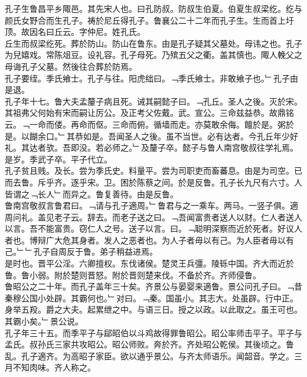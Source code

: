 \documentclass{zhvt-classic}
\begin{document}

\hspace*{2em}孔子生鲁昌平乡陬邑。其先宋人也。曰孔防叔。防叔生伯夏。伯夏生叔梁纥。纥与颜氏女野合而生孔子。祷於尼丘得孔子。鲁襄公二十二年而孔子生。生而首上圩顶。故因名曰丘云。字仲尼。姓孔氏。\\
\hspace*{2em}丘生而叔梁纥死。葬於防山。防山在鲁东。由是孔子疑其父墓处。母讳之也。孔子为兒嬉戏。常陈俎豆。设礼容。孔子母死。乃殡五父之衢。盖其慎也。陬人輓父之母诲孔子父墓。然後往合葬於防焉。\\
\hspace*{2em}孔子要绖。季氏飨士。孔子与往。阳虎绌曰。﹁季氏飨士。非敢飨子也。﹂孔子由是退。\\
\hspace*{2em}孔子年十七。鲁大夫孟釐子病且死。诫其嗣懿子曰。﹁孔丘。圣人之後。灭於宋。其祖弗父何始有宋而嗣让厉公。及正考父佐戴。武。宣公。三命兹益恭。故鼎铭云。﹁一命而偻。再命而伛。三命而俯。循墙而走。亦莫敢余侮。饘於是。粥於是。以餬余口。﹂其恭如是。吾闻圣人之後。虽不当世。必有达者。今孔丘年少好礼。其达者欤。吾即没。若必师之。﹂及釐子卒。懿子与鲁人南宫敬叔往学礼焉。是岁。季武子卒。平子代立。\\
\hspace*{2em}孔子贫且贱。及长。尝为季氏史。料量平。尝为司职吏而畜蕃息。由是为司空。已而去鲁。斥乎齐。逐乎宋。卫。困於陈蔡之间。於是反鲁。孔子长九尺有六寸。人皆谓之﹁长人﹂而异之。鲁复善待。由是反鲁。\\
\hspace*{2em}鲁南宫敬叔言鲁君曰。﹁请与孔子適周。﹂鲁君与之一乘车。两马。一竖子俱。適周问礼。盖见老子云。辞去。而老子送之曰。﹁吾闻富贵者送人以财。仁人者送人以言。吾不能富贵。窃仁人之号。送子以言。曰。﹁聪明深察而近於死者。好议人者也。博辩广大危其身者。发人之恶者也。为人子者毋以有己。为人臣者毋以有己。﹂﹂孔子自周反于鲁。弟子稍益进焉。\\
\hspace*{2em}是时也。晋平公淫。六卿擅权。东伐诸侯。楚灵王兵彊。陵轹中国。齐大而近於鲁。鲁小弱。附於楚则晋怒。附於晋则楚来伐。不备於齐。齐师侵鲁。\\
\hspace*{2em}鲁昭公之二十年。而孔子盖年三十矣。齐景公与晏婴来適鲁。景公问孔子曰。﹁昔秦穆公国小处辟。其霸何也。﹂对曰。﹁秦。国虽小。其志大。处虽辟。行中正。身举五羖。爵之大夫。起累绁之中。与语三日。授之以政。以此取之。虽王可也。其霸小矣。﹂景公说。\\
\hspace*{2em}孔子年三十五。而季平子与郈昭伯以斗鸡故得罪鲁昭公。昭公率师击平子。平子与孟氏。叔孙氏三家共攻昭公。昭公师败。奔於齐。齐处昭公乾侯。其後顷之。鲁乱。孔子適齐。为高昭子家臣。欲以通乎景公。与齐太师语乐。闻韶音。学之。三月不知肉味。齐人称之。\\
\end{document}
